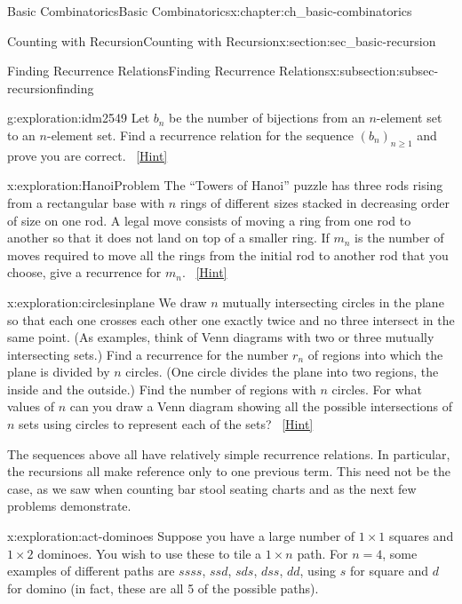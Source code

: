 \documentclass[oneside,10pt,]{book}
\numberwithin{equation}{chapter}
\begin{document}
\begin{chapterptx}{Basic Combinatorics}{}{Basic Combinatorics}{}{}{x:chapter:ch_basic-combinatorics}
\begin{sectionptx}{Counting with Recursion}{}{Counting with Recursion}{}{}{x:section:sec_basic-recursion}
\begin{subsectionptx}{Finding Recurrence Relations}{}{Finding Recurrence Relations}{}{}{x:subsection:subsec-recursionfinding}
\begin{exploration}{}{g:exploration:idm2549}%
Let \(b_n\) be the number of bijections from an \(n\)-element set to an \(n\)-element set.  Find a recurrence relation for the sequence \((b_n)_{n \ge 1}\) and prove you are correct.%
\qquad~\hfill{\tiny\hyperlink{g:hint:idm2556-back}{[Hint]}}\end{exploration}
\begin{exploration}{}{x:exploration:HanoiProblem}%
The ``Towers of Hanoi'' puzzle has three rods rising from a rectangular base with \(n\) rings of different sizes stacked in decreasing order of size on one rod. A legal move consists of moving a ring from one rod to another so that it does not land on top of a smaller ring. If \(m_n\) is the number of moves required to move all the rings from the initial rod to another rod that you choose, give a recurrence for \(m_n\).%
\qquad~\hfill{\tiny\hyperlink{g:hint:idm2567-back}{[Hint]}}\end{exploration}
\begin{exploration}{}{x:exploration:circlesinplane}%
We draw \(n\) mutually intersecting circles in the plane so that each one crosses each other one exactly twice and no three intersect in the same point. (As examples, think of Venn diagrams with two or three mutually intersecting sets.) Find a recurrence for the number \(r_n\) of regions into which the plane is divided by \(n\) circles. (One circle divides the plane into two regions, the inside and the outside.) Find the number of regions with \(n\) circles. For what values of \(n\) can you draw a Venn diagram showing all the possible intersections of \(n\) sets using circles to represent each of the sets?%
\qquad~\hfill{\tiny\hyperlink{g:hint:idm2585-back}{[Hint]}}\end{exploration}
The sequences above all have relatively simple recurrence relations.  In particular, the recursions all make reference only to one previous term.  This need not be the case, as we saw when counting bar stool seating charts and as the next few problems demonstrate.%
\begin{exploration}{}{x:exploration:act-dominoes}%
Suppose you have a large number of \(1\times 1\) squares and \(1 \times 2\) dominoes.  You wish to use these to tile a \(1 \times n\) path.  For \(n = 4\), some examples of different paths are \(ssss\), \(ssd\), \(sds\), \(dss\), \(dd\), using \(s\) for square and \(d\) for domino (in fact, these are all 5 of the possible paths).%
\begin{enumerate}[font=\bfseries,label=(\alph*),ref=\alph*]

\end{enumerate}
\end{exploration}
\end{subsectionptx}
\end{sectionptx}
\end{chapterptx}
\end{document}
